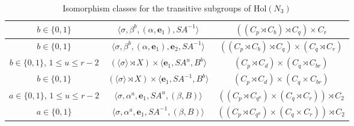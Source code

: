 \documentclass[a4paper,reqno]{amsart}
\theoremstyle{definition}
\newcommand{\e}{\textbf{e}}
\newcommand{\Hol}{\mathrm{Hol}}
\begin{document}
\begin{table}
{\begin{tabular}{|c|c|c|}
    \hline
    $b \in \{0,1\}$ & $\langle \sigma,\beta^b,(\alpha,\e_1),SA^{-1} \rangle$ & $((C_p \rtimes C_b) \rtimes C_q) \times C_r$\\
    \hline
    $b \in \{0,1\}$ & $\langle \sigma, \beta^b, (\alpha,\e_1), \e_2, SA^{-1} \rangle$ & $((C_p \rtimes C_b) \rtimes C_q) \times (C_q \rtimes C_r)$\\
    \hline
    $b \in \{0,1\}$, $1 \leq u \leq r-2$ & $(\langle \sigma \rangle \rtimes X) \times \langle \e_1,SA^u,B^b \rangle$ & $(C_p \rtimes C_d) \times (C_q \rtimes C_{br})$\\
    \hline
    $b \in \{0,1\}$ & $(\langle \sigma \rangle \rtimes X) \times \langle \e_1,SA^{-1},B^b \rangle$ & $(C_p \rtimes C_d) \times (C_q \times C_{br})$\\
    \hline
    $a \in \{0,1\}$, $1 \leq u \leq r-2$ & $\langle \sigma,\alpha^a,\e_1,SA^u,(\beta,B) \rangle$ & $((C_p \rtimes C_{q^a}) \times (C_q \rtimes C_r)) \rtimes C_2$\\
    \hline
    $a \in \{0,1\}$ & $\langle \sigma,\alpha^a,\e_1,SA^{-1},(\beta,B) \rangle$ & $((C_p \rtimes C_{q^a}) \times (C_q \times C_r)) \rtimes C_2$\\
    \hline
    \end{tabular}}
    \vskip5mm
    \caption{Isomorphism classes for the transitive subgroups of $\Hol(N_3)$}
    \label{N3_isom_classes}
\end{table}
\end{document}
